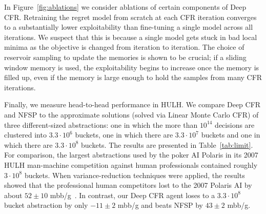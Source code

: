 \documentclass{article}
\newcommand{\adam}[1]{\textbf{\textcolor{magenta}{#1}}}
\begin{document}
In Figure~\ref{fig:ablations} we consider ablations of certain components of Deep CFR. Retraining the regret model from scratch at each CFR iteration converges to a substantially lower exploitability than fine-tuning a single model across all iterations. We suspect that this is because a single model gets stuck in bad local minima as the objective is changed from iteration to iteration. The choice of reservoir sampling to update the memories is shown to be crucial; if a sliding window memory is used, the exploitability begins to increase once the memory is filled up, even if the memory is large enough to hold the samples from many CFR iterations.


Finally, we measure head-to-head performance in HULH. We compare Deep CFR and NFSP to the approximate solutions (solved via Linear Monte Carlo CFR) of three different-sized abstractions: one in which the more than $10^{14}$ decisions are clustered into $3.3 \cdot 10^6$ buckets, one in which there are $3.3 \cdot 10^7$ buckets and one in which there are $3.3 \cdot 10^8$ buckets. The results are presented in Table~\ref{tab:limit}. For comparison, the largest abstractions used by the poker AI Polaris in its 2007 HULH man-machine competition against human professionals contained roughly $3 \cdot 10^8$ buckets. When variance-reduction techniques were applied, the results showed that the professional human competitors lost to the 2007 Polaris AI by about $52 \pm 10$ mbb/g~\cite{Johanson16:Robust}. In contrast, our Deep CFR agent loses to a $3.3 \cdot 10^8$ bucket abstraction by only $-11 \pm 2$ mbb/g and beats NFSP by $43 \pm 2$ mbb/g.

\end{document}
